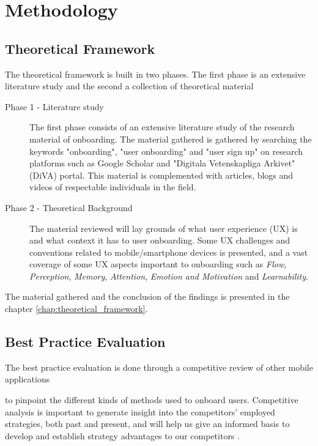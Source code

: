 \chapter{Methodology}
\label{chap:methodology}

\section{Theoretical Framework}
The theoretical framework is built in two phases. The first phase is an extensive literature study and the second a collection of theoretical material

\begin{description}
  \item [Phase 1 - Literature study] The first phase consists of an extensive literature study of the research material of onboarding. The material gathered is gathered by searching the keywords "onboarding", "user onboarding" and "user sign up" on research platforms such as Google Scholar and "Digitala Vetenskapliga Arkivet" (DiVA) portal. This material is complemented with articles, blogs and videos of respectable individuals in the field.
  \item [Phase 2 - Theoretical Background] The material reviewed will lay grounds of what user experience (UX) is and what context it has to user onboarding. Some UX challenges and conventions related to mobile/smartphone devices is presented, and a vast coverage of some UX aspects important to onboarding such as \textit{Flow}, \textit{Perception}, \textit{Memory}, \textit{Attention}, \textit{Emotion and Motivation} and \textit{Learnability}.
\end{description}

The material gathered and the conclusion of the findings is presented in the chapter \ref{chap:theoretical_framework}.

\section{Best Practice Evaluation}
%
The best practice evaluation is done through a competitive review \cite{Schade2013} of other mobile applications  to pinpoint the different kinds of methods used to onboard users. Competitive analysis is important to generate insight into the competitors' employed strategies, both past and present, and will help us give an informed basis to develop and establish strategy advantages to our competitors \cite{Wilson2010}.

